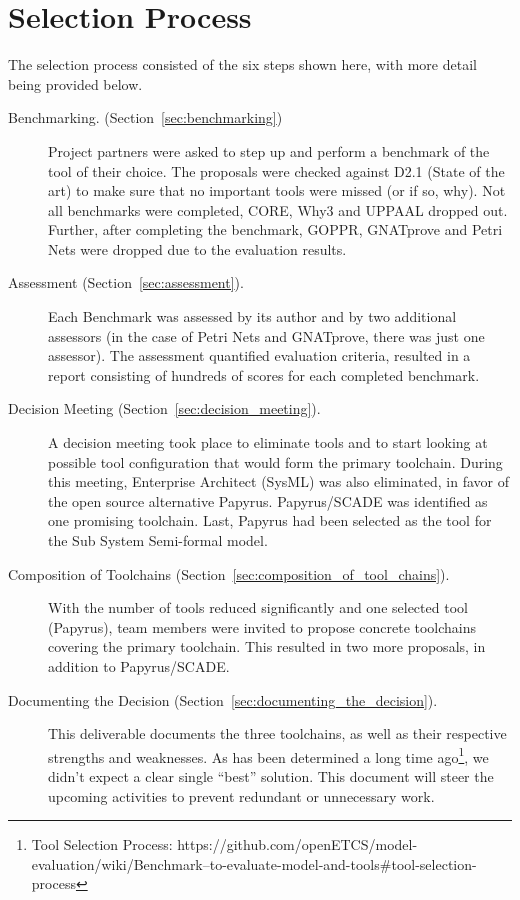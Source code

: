 \section{Selection Process}

The selection process consisted of the six steps shown here, with more detail being provided below.

\begin{description}

\item[Benchmarking. (Section~\ref{sec:benchmarking})] Project partners were asked to step up and perform a benchmark of the tool of their choice.  The proposals were checked against D2.1 (State of the art) to make sure that no important tools were missed (or if so, why).  Not all benchmarks were completed, CORE, Why3 and UPPAAL dropped out.  Further, after completing the benchmark, GOPPR, GNATprove and Petri Nets were dropped due to the evaluation results.

\item[Assessment (Section~\ref{sec:assessment}).] Each Benchmark was assessed by its author and by two additional assessors (in the case of Petri Nets and GNATprove, there was just one assessor).  The assessment quantified evaluation criteria, resulted in a report consisting of hundreds of scores for each completed benchmark.

\item[Decision Meeting (Section~\ref{sec:decision_meeting}).] A decision meeting took place to eliminate tools and to start looking at possible tool configuration that would form the primary toolchain.  During this meeting, Enterprise Architect (SysML) was also eliminated, in favor of the open source alternative Papyrus.  Papyrus/SCADE was identified as one promising toolchain.  Last, Papyrus had been selected as the tool for the Sub System Semi-formal model.

\item[Composition of Toolchains (Section~\ref{sec:composition_of_tool_chains}).] With the number of tools reduced significantly and one selected tool (Papyrus), team members were invited to propose concrete toolchains covering the primary toolchain.  This resulted in two more proposals, in addition to Papyrus/SCADE.

\item[Documenting the Decision (Section~\ref{sec:documenting_the_decision}).] This deliverable documents the three toolchains, as well as their respective strengths and weaknesses.  As has been determined a long time ago\footnote{Tool Selection Process: https://github.com/openETCS/model-evaluation/wiki/Benchmark--to-evaluate-model-and-tools\#tool-selection-process}, we didn't expect a clear single ``best'' solution.  This document will steer the upcoming activities to prevent redundant or unnecessary work.


\end{description}
